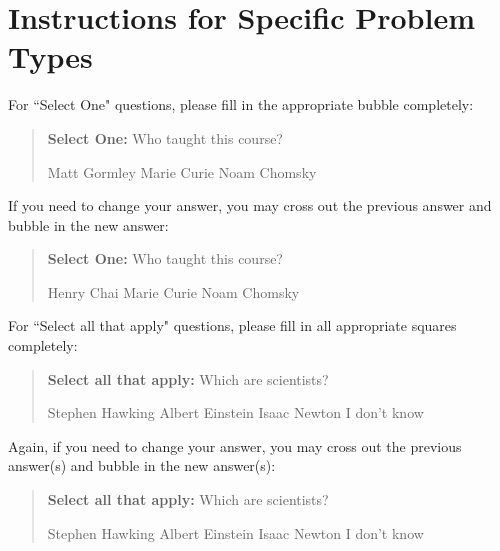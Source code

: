 \documentclass[11pt,addpoints,answers]{exam}
\newcommand{\blackcircle}{\tikz\draw[black,fill=black] (0,0) circle (1ex);}
\begin{document}
\section*{Instructions for Specific Problem Types}

For ``Select One" questions, please fill in the appropriate bubble completely:

\begin{quote}
\textbf{Select One:} Who taught this course?
    \begin{checkboxes}
     \CorrectChoice Matt Gormley
     \choice Marie Curie
     \choice Noam Chomsky
    \end{checkboxes}
\end{quote}

If you need to change your answer, you may cross out the previous answer and bubble in the new answer:

\begin{quote}
\textbf{Select One:} Who taught this course?
    {
    \begin{checkboxes}
     \CorrectChoice Henry Chai
     \choice Marie Curie \checkboxchar{\xcancel{\blackcircle}{}}
     \choice Noam Chomsky
    \end{checkboxes}
    }
\end{quote}

For ``Select all that apply" questions, please fill in all appropriate squares completely:

\begin{quote}
\textbf{Select all that apply:} Which are scientists?
    {%
    \checkboxchar{$\Box$} \checkedchar{$\blacksquare$} %
    \begin{checkboxes}
    \CorrectChoice Stephen Hawking 
    \CorrectChoice Albert Einstein
    \CorrectChoice Isaac Newton
    \choice I don't know
    \end{checkboxes}
    }
\end{quote}

Again, if you need to change your answer, you may cross out the previous answer(s) and bubble in the new answer(s):

\begin{quote}
\textbf{Select all that apply:} Which are scientists?
    {%
    \checkboxchar{\xcancel{$\blacksquare$}} \checkedchar{$\blacksquare$} %
    \begin{checkboxes}
    \CorrectChoice Stephen Hawking 
    \CorrectChoice Albert Einstein
    \CorrectChoice Isaac Newton
    \choice I don't know
    \end{checkboxes}
    }
\end{quote}
\end{document}
